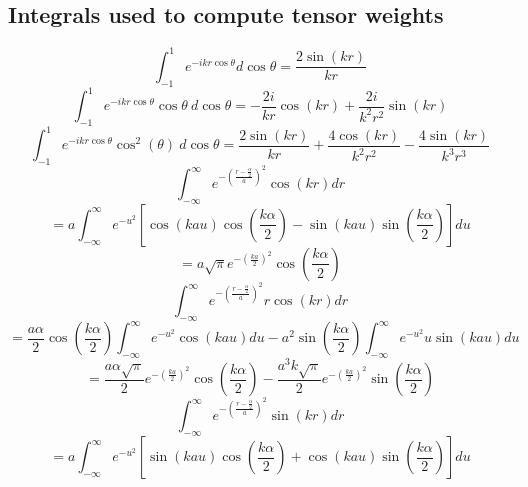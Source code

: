 \documentclass[letterpaper,twocolumn,amsmath,amssymb,prb]{revtex4-1}
\begin{document}
\begin{widetext}
\subsection{Integrals used to compute tensor weights}
\begin{equation}{\int_{-1}^{1}{e^{-ikr\cos{\theta}}d{\cos{\theta}}}=\frac{2\sin(kr)}{kr}}\end{equation} 
\[{}\]
\begin{equation}{\int_{-1}^{1}{e^{-ikr\cos{\theta}}\cos{\theta}{~}d{\cos{\theta}}}=-\frac{2i}{kr}\cos(kr)+\frac{2i}{k^2r^2}\sin(kr)}\end{equation} 
\[{}\]
\begin{equation}{\int_{-1}^{1}{e^{-ikr\cos{\theta}}\cos^2(\theta)~d{\cos{\theta}}}=\frac{2\sin(kr)}{kr}+\frac{4\cos(kr)}{k^2r^2}-\frac{4\sin(kr)}{k^3r^3}}\end{equation} 
\[{}\]
\[{}\]
\begin{equation}{\int_{-\infty}^{\infty}{e^{-\left(\frac{r-\frac{\alpha}{2}}{a}\right)^2}\cos(kr)d{r}}}\end{equation}
\begin{displaymath}{=a\int_{-\infty}^{\infty}{e^{-u^2}\left[\cos(kau)\cos(\frac{k\alpha}{2})-\sin(kau)\sin(\frac{k\alpha}{2})\right]d{u}}}\end{displaymath}  
\begin{equation}{=a\sqrt{\pi}e^{-\left(\frac{ka}{2}\right)^2}\cos(\frac{k\alpha}{2})}\end{equation} 
\[{}\]
\begin{equation}{\int_{-\infty}^{\infty}{e^{-\left(\frac{r-\frac{\alpha}{2}}{a}\right)^2}r\cos(kr)d{r}}}\end{equation}
\begin{equation}{=\frac{a\alpha}{2}\cos\left(\frac{k\alpha}{2}\right)\int_{-\infty}^{\infty}{e^{-u^2}\cos(kau)d{u}} -a^2\sin\left(\frac{k\alpha}{2}\right)\int_{-\infty}^{\infty}{e^{-u^2}u\sin(kau)d{u}}}\end{equation}
\begin{equation}{=\frac{a\alpha\sqrt{\pi}}{2}e^{-\left(\frac{ka}{2}\right)^2}\cos\left(\frac{k\alpha}{2}\right)-\frac{a^3k\sqrt{\pi}}{2}e^{-\left(\frac{ka}{2}\right)^2}\sin\left(\frac{k\alpha}{2}\right)}\end{equation}
\[{}\]
\begin{equation}{\int_{-\infty}^{\infty}{e^{-\left(\frac{r-\frac{\alpha}{2}}{a}\right)^2}\sin(kr)d{r}}}\end{equation} 
\begin{displaymath}{=a\int_{-\infty}^{\infty}{e^{-u^2}\left[\sin(kau)\cos(\frac{k\alpha}{2})+\cos(kau)\sin(\frac{k\alpha}{2})\right]d{u}}}\end{displaymath}  

\end{widetext}
\end{document}

